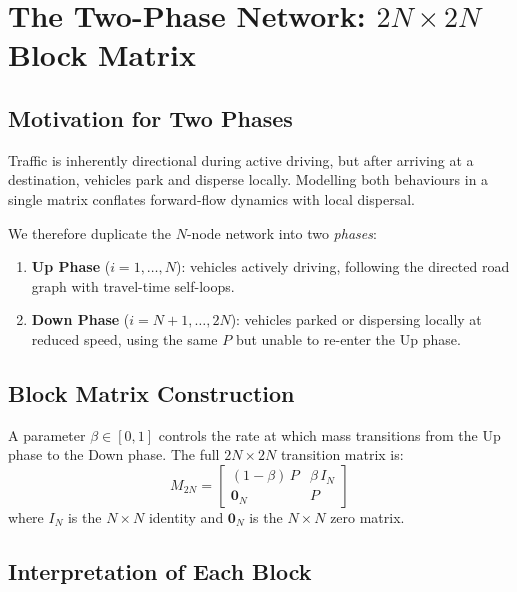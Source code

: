 \documentclass[12pt,a4paper]{article}
\theoremstyle{definition}
\theoremstyle{plain}
\begin{document}
\section{The Two-Phase Network: $2N \times 2N$ Block Matrix}
\label{sec:block}

\subsection{Motivation for Two Phases}

Traffic is inherently directional during active driving, but after arriving at a
destination, vehicles park and disperse locally. Modelling both behaviours in a single
matrix conflates forward-flow dynamics with local dispersal.

We therefore duplicate the $N$-node network into two \emph{phases}:
\begin{enumerate}[label=\textbf{\arabic*.}]
  \item \textbf{Up Phase} ($i = 1, \ldots, N$): vehicles actively driving,
    following the directed road graph with travel-time self-loops.
  \item \textbf{Down Phase} ($i = N+1, \ldots, 2N$): vehicles parked or dispersing
    locally at reduced speed, using the same $P$ but unable to re-enter the Up phase.
\end{enumerate}

\subsection{Block Matrix Construction}

A parameter $\beta \in [0,1]$ controls the rate at which mass transitions from the Up
phase to the Down phase. The full $2N \times 2N$ transition matrix is:
\begin{equation}
  \boxed{M_{2N} =
  \begin{bmatrix}
    (1-\beta)\,P & \beta\,I_N \\
    \mathbf{0}_N & P
  \end{bmatrix}}
  \label{eq:block}
\end{equation}
where $I_N$ is the $N \times N$ identity and $\mathbf{0}_N$ is the $N \times N$ zero
matrix.

\subsection{Interpretation of Each Block}
\end{document}

